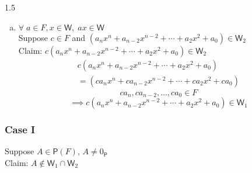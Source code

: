 \documentclass[letterpaper,12pt]{article}
\newcommand{\?}{\stackrel{?}{=}}
\begin{document}
\begin{spacing}{1.5}
\begin{enumerate}
\begin{enumerate}[(a)]
\paragraph{} 
Without loss of generality assume $n\leq m \implies \exists\; k \in
\left[0,\frac{n}{2}\right]$ such that $m= n -2k$
\begin{multline}
\left(a_nx^n + a_{n-2}x^{n-2}+\cdots+ a_2x^2 + a_0\right) + \\
\left(b_mx^m + b_{m-2}x^{m-2}+\cdots+ b_2x^2 +
  b_0\right)
\end{multline}
\begin{multline}
\left(a_nx^n + a_{n-2}x^{n-2}+\cdots+\\
  \left(a_{n-2k}+b_{n-2k}\right)\left(x^{n-2k}\right)+ 
  \left(a_{n-2k-2}+b_{n-2k-2}\right)\left(x^{n-2k-2}\right) +\cdots+ \\
\left(a_2+b_2\right)x^2 + \left(a_0+b_0\right)\right)
\end{multline}
\begin{multline}
\implies \left(a_nx^n + a_{n-2}x^{n-2}+\cdots+ a_2x^2 + a_0\right) +\\
\left(b_mx^m + b_{m-2}x^{m-2}+\cdots+ b_2x^2 +b_0\right) \in \mathsf{W}_2
\end{multline}
\item $ \forall\; a\in F, x \in \mathsf{W}, \; ax \in \mathsf{W}$
\\
Suppose $c\in F$ and $\left(a_nx^n + a_{n-2}x^{n-2}+\cdots+ a_2x^2 +
  a_0\right)\in \mathsf{W}_2$\\
Claim: $ c\left(a_nx^n + a_{n-2}x^{n-2}+\cdots+ a_2x^2 + a_0\right)
\in \mathsf{W}_2$
\begin{multline}
c\left(a_nx^n + a_{n-2}x^{n-2}+\cdots+ a_2x^2 + a_0\right)\\
= \left(ca_nx^n + ca_{n-2}x^{n-2}+\cdots+ ca_2x^2 + ca_0\right)
\end{multline}
\begin{equation}
ca_n,ca_{n-2},\dots,ca_0 \in F
\end{equation}
\begin{equation}
\implies c\left(a_nx^n + a_{n-2}x^{n-2}+\cdots+ a_2x^2 + a_0\right) \in \mathsf{W}_1
\end{equation}
\end{enumerate}
\subsubsection*{Case I}
Suppose $A \in \mathsf{P}(F)$, $A\neq 0_\mathsf{P}$\\
Claim: $A \notin \mathsf{W}_1 \cap \mathsf{W}_2$

\end{enumerate}
\end{spacing}
\end{document}
